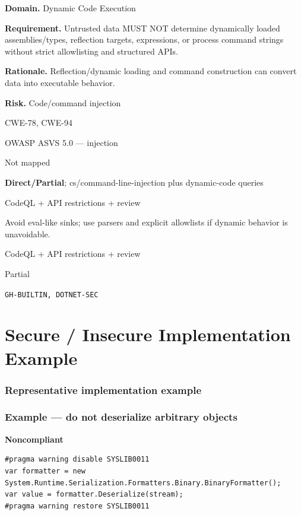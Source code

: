 \documentclass[10pt,letterpaper]{article}
\newcommand{\prioritybadge}[2]{\tcbox[on line,boxrule=0pt,arc=1.2mm,boxsep=0.7mm,left=1mm,right=1mm,top=0.4mm,bottom=0.4mm,colback=#2!12,coltext=#2]{\scriptsize\bfseries #1}}
\begin{document}
\begin{rulebox}[title={\texttt{SCS-CSHARP-DYN-001} \hfill \prioritybadge{Critical Control}{Critical}}]
\textbf{Domain.} Dynamic Code Execution

\textbf{Requirement.} Untrusted data MUST NOT determine dynamically loaded assemblies/types, reflection targets, expressions, or process command strings without strict allowlisting and structured APIs.

\textbf{Rationale.} Reflection/dynamic loading and command construction can convert data into executable behavior.

\textbf{Risk.} Code/command injection

\begin{description}[leftmargin=2.65cm,labelwidth=2.3cm,style=nextline,itemsep=1pt,topsep=3pt]
  \item[CWE] CWE-78, CWE-94
  \item[OWASP] OWASP ASVS 5.0 --- injection
  \item[CERT] Not mapped
  \item[CodeQL] \textbf{Direct/Partial}; cs/command-line-injection plus dynamic-code queries
  \item[Enforcement] CodeQL + API restrictions + review
  \item[Prevention] Avoid eval-like sinks; use parsers and explicit allowlists if dynamic behavior is unavoidable.
  \item[Verification] CodeQL + API restrictions + review
  \item[Automation] Partial
  \item[Sources] \texttt{GH-BUILTIN, DOTNET-SEC}
\end{description}
\end{rulebox}
\section{Secure / Insecure Implementation Example}
\subsubsection*{Representative implementation example}
\subsubsection*{Example --- do not deserialize arbitrary objects}

\textbf{Noncompliant}\par
\begin{lstlisting}[language={[Sharp]C}]
#pragma warning disable SYSLIB0011
var formatter = new System.Runtime.Serialization.Formatters.Binary.BinaryFormatter();
var value = formatter.Deserialize(stream);
#pragma warning restore SYSLIB0011
\end{lstlisting}
\end{document}
